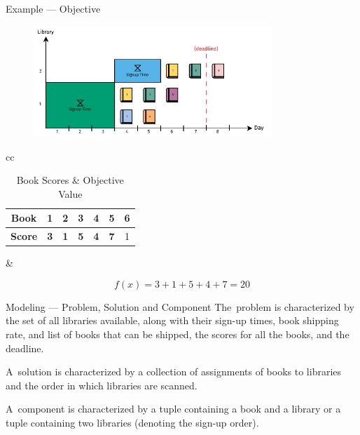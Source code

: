\begin{frame}{Example --- Objective}
  \begin{figure}[h]
    \centering
    \includegraphics[width=0.8\textwidth,keepaspectratio]{../assets/bs/bs-example-slides.pdf}
  \end{figure}
  \begin{table}
    \begin{tabular}{cc}
      \begin{minipage}{0.5\textwidth}
        \begin{table}[ht]
          \centering
          \begin{tabular}{ccccccc}
            \toprule
            \textbf{Book}  & 1          & 2          & 3          & 4          & 5          & 6 \\ \midrule
            \textbf{Score} & \textbf{3} & \textbf{1} & \textbf{5} & \textbf{4} & \textbf{7} & 1 \\
            \bottomrule
          \end{tabular}
        \end{table}
      \end{minipage}
       &
      \begin{minipage}[b]{0.5\textwidth}
        \centering
        \begin{equation*}
          f(x) = 3 + 1 + 5 + 4 + 7 = 20
        \end{equation*}
      \end{minipage}
    \end{tabular}
    \caption{Book Scores \& Objective Value}
  \end{table}
\end{frame}

\begin{frame}{Modeling --- Problem, Solution and Component}
  The~\alert{problem} is characterized by the set of all libraries available, along with
  their sign-up times, book shipping rate, and list of books that can be shipped,
  the scores for all the books, and the deadline.

  A~\alert{solution} is characterized by a collection of assignments of books
  to libraries and the order in which libraries are scanned.

  A~\alert{component} is characterized by a tuple containing a book and a library or
  a tuple containing two libraries (denoting the sign-up order).
\end{frame}

